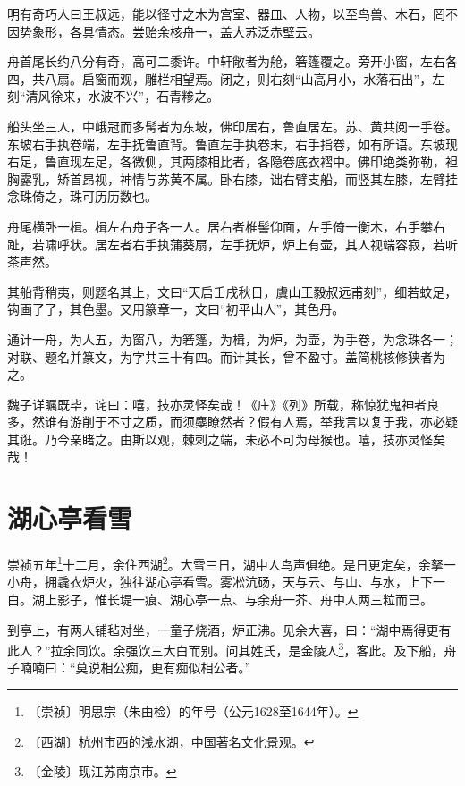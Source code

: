 \documentclass[12pt,UTF-8,openany]{ctexbook}
\begin{document}
\begin{normalsize}
    
    明有奇巧人曰王叔远，能以径寸之木为宫室、器皿、人物，以至鸟兽、木石，罔不因势象形，各具情态。尝贻余核舟一，盖大苏泛赤壁云。
    
    舟首尾长约八分有奇，高可二黍许。中轩敞者为舱，箬篷覆之。旁开小窗，左右各四，共八扇。启窗而观，雕栏相望焉。闭之，则右刻“山高月小，水落石出”，左刻“清风徐来，水波不兴”，石青糁之。
    
    船头坐三人，中峨冠而多髯者为东坡，佛印居右，鲁直居左。苏、黄共阅一手卷。东坡右手执卷端，左手抚鲁直背。鲁直左手执卷末，右手指卷，如有所语。东坡现右足，鲁直现左足，各微侧，其两膝相比者，各隐卷底衣褶中。佛印绝类弥勒，袒胸露乳，矫首昂视，神情与苏黄不属。卧右膝，诎右臂支船，而竖其左膝，左臂挂念珠倚之，珠可历历数也。
    
    舟尾横卧一楫。楫左右舟子各一人。居右者椎髻仰面，左手倚一衡木，右手攀右趾，若啸呼状。居左者右手执蒲葵扇，左手抚炉，炉上有壶，其人视端容寂，若听茶声然。
    
    其船背稍夷，则题名其上，文曰“天启壬戌秋日，虞山王毅叔远甫刻”，细若蚊足，钩画了了，其色墨。又用篆章一，文曰“初平山人”，其色丹。
    
    通计一舟，为人五，为窗八，为箬篷，为楫，为炉，为壶，为手卷，为念珠各一；对联、题名并篆文，为字共三十有四。而计其长，曾不盈寸。盖简桃核修狭者为之。
    
    魏子详瞩既毕，诧曰：嘻，技亦灵怪矣哉！《庄》《列》所载，称惊犹鬼神者良多，然谁有游削于不寸之质，而须麋瞭然者？假有人焉，举我言以复于我，亦必疑其诳。乃今亲睹之。由斯以观，棘刺之端，未必不可为母猴也。嘻，技亦灵怪矣哉！
\end{normalsize}



\chapter{湖心亭看雪}

\begin{normalsize}
    
    崇祯五年\footnote{〔崇祯〕明思宗（朱由检）的年号（公元1628至1644年）。}十二月，余住西湖\footnote{〔西湖〕杭州市西的浅水湖，中国著名文化景观。}。大雪三日，湖中人鸟声俱绝。是日更定矣，余拏一小舟，拥毳衣炉火，独往湖心亭看雪。雾凇沆砀，天与云、与山、与水，上下一白。湖上影子，惟长堤一痕、湖心亭一点、与余舟一芥、舟中人两三粒而已。
    
    到亭上，有两人铺毡对坐，一童子烧酒，炉正沸。见余大喜，曰：“湖中焉得更有此人？”拉余同饮。余强饮三大白而别。问其姓氏，是金陵人\footnote{〔金陵〕现江苏南京市。}，客此。及下船，舟子喃喃曰：“莫说相公痴，更有痴似相公者。”
\end{normalsize}
\end{document}
